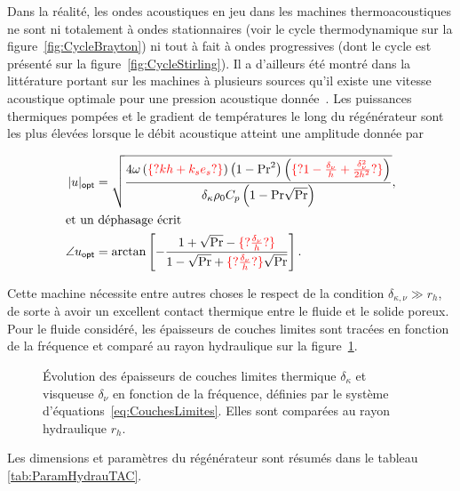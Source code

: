 Dans la réalité, les ondes acoustiques en jeu dans les machines thermoacoustiques ne sont ni totalement \og à ondes stationnaires \fg{} (voir le cycle thermodynamique sur la figure~\ref{fig:CycleBrayton}) ni tout à fait \og à ondes progressives \fg{} (dont le cycle est présenté sur la figure~\ref{fig:CycleStirling}). Il a d'ailleurs été montré dans la littérature portant sur les machines à plusieurs sources qu'il existe une vitesse acoustique optimale pour une pression acoustique donnée~\cite{poignand_etude_2006, poignand_thermoacoustic_2011}. Les puissances thermiques pompées et le gradient de températures le long du régénérateur sont les plus élevées lorsque le débit acoustique atteint une amplitude donnée par

\begin{subequations}
	\begin{align}
		|u|_{\sf opt} &= \sqrt{\frac{4\omega\left(\textcolor{red}{\{?kh+k_se_s?\}}\right)\left(1-\mathrm{Pr}^2\right)\left(\textcolor{red}{\{?1-\frac{\delta_\nu}{h}+\frac{\delta_\nu^2}{2h^2}?\}}\right)}{\delta_\kappa \rho_0 C_p \left(1-\mathrm{Pr}\sqrt{\mathrm{Pr}}\right)}},	\label{eq:u_mag_opt_Gaelle}\\
		\intertext{et un déphasage écrit}
		\angle u_{\sf opt} &= \arctan\left[-\frac{1+\sqrt{\mathrm{Pr}}-\textcolor{red}{\{?\frac{\delta_\nu}{h}?\}}}{1-\sqrt{\mathrm{Pr}}+\textcolor{red}{\{?\frac{\delta_\nu}{h}?\}}\sqrt{\mathrm{Pr}}}\right].	\label{eq:u_arg_opt_Gaelle}
	\end{align}
	\label{eq:u_opt_Gaelle}
\end{subequations}

Cette machine nécessite entre autres choses le respect de la condition $\delta_{\kappa,\nu} \gg r_h$, de sorte à avoir un excellent contact thermique entre le fluide et le solide poreux. Pour le fluide considéré, les épaisseurs de couches limites sont tracées en fonction de la fréquence et comparé au rayon hydraulique sur la figure~\ref{fig:dKdV}.

\begin{figure}[!ht]
    \centering
    
    \caption{\'Evolution des épaisseurs de couches limites thermique $\delta_\kappa$ et visqueuse $\delta_\nu$ en fonction de la fréquence, définies par le système d'équations~\eqref{eq:CouchesLimites}. Elles sont comparées au rayon hydraulique $r_h$.}
    \label{fig:dKdV}
\end{figure}

Les dimensions et paramètres du régénérateur sont résumés dans le tableau \ref{tab:ParamHydrauTAC}.

